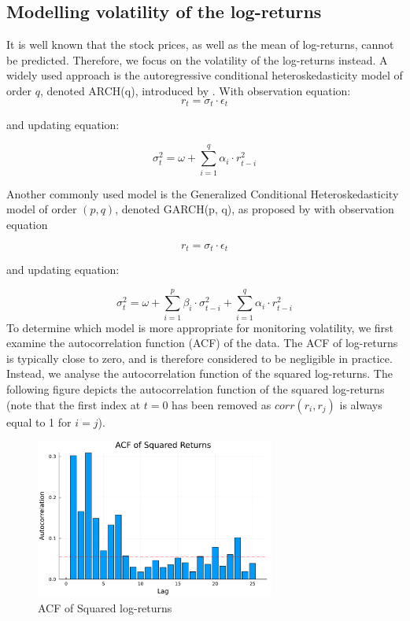 \subsection{Modelling volatility of the log-returns}
It is well known that the stock prices, as well as the mean of log-returns, cannot be predicted. Therefore, we focus on the volatility of the log-returns instead. A widely used approach is the autoregressive conditional heteroskedasticity model of order \(q\), denoted ARCH(q), introduced by \cite{engle1982}. With observation equation: 
\begin{equation}
    r_t = \sigma_t \cdot \epsilon_t
\end{equation}

and updating equation:

\begin{equation}
    \sigma^2_t = \omega + \sum_{i = 1}^{q} \alpha_i \cdot r^2_{t-i}
\end{equation}

Another commonly used model is the Generalized Conditional Heteroskedasticity model of order \((p, q)\), denoted GARCH(p, q), as proposed by \cite{bollerslev1986} with observation equation

\begin{equation}
    r_t = \sigma_t \cdot \epsilon_t 
\end{equation}

and updating equation:

\begin{equation}
    \sigma^2_t = \omega + \sum_{i = 1}^{p} \beta_i \cdot \sigma^2_{t-i} + \sum_{i = 1}^{q} \alpha_i \cdot r^2_{t-i}
\end{equation}
To determine which model is more appropriate for monitoring volatility, we first examine the autocorrelation function (ACF) of the data. The ACF of log-returns is typically close to zero, and is therefore considered to be negligible in practice. Instead, we analyse the autocorrelation function of the squared log-returns.
The following figure depicts the autocorrelation function of the squared log-returns (note that the first index at \(t = 0\) has been removed as \(corr(r_i, r_j)\) is always equal to 1 for \(i = j\)).

\begin{figure}[H]
    \centering
    \includegraphics[width=0.7\textwidth]{figures/acf_squared_returns.pdf}
    \caption{ACF of Squared log-returns}
    \label{fig:acf_squared_returns}
\end{figure}

